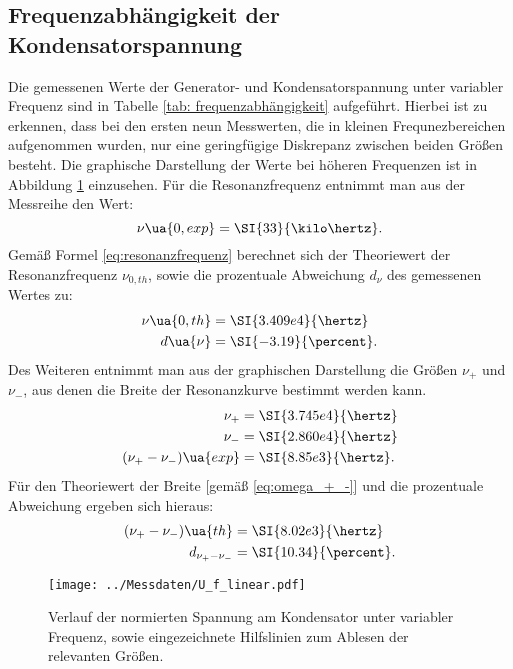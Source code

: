 \subsection{Frequenzabhängigkeit der Kondensatorspannung}
Die gemessenen Werte der Generator- und Kondensatorspannung unter variabler Frequenz sind in Tabelle \ref{tab: frequenzabhängigkeit} aufgeführt.
Hierbei ist zu erkennen, dass bei den ersten neun Messwerten, die in kleinen Frequnezbereichen aufgenommen wurden, nur eine geringfügige
Diskrepanz zwischen beiden Größen besteht. Die graphische Darstellung der Werte bei höheren Frequenzen ist in Abbildung \ref{fig: spannungsverlauf_U_C}
einzusehen. Für die Resonanzfrequenz entnimmt man aus der Messreihe den Wert:
\begin{equation}
  \nu\ua{0, exp} = \SI{33}{\kilo\hertz}.
  \label{eq: exp_resonanzfrequenz}
\end{equation}
Gemäß Formel \eqref{eq:resonanzfrequenz} berechnet sich der Theoriewert der Resonanzfrequenz $\nu_{0, th}$, sowie die prozentuale Abweichung $d_{\nu}$ des gemessenen Wertes zu:
\begin{align}
  \begin{aligned}
  \nu\ua{0, th} &= \SI{3.409e4}{\hertz} \\
  d\ua{\nu} &= \SI{-3.19}{\percent}.
\end{aligned}
\label{eq: theo_resonanzfrequenz}
\end{align}
Des Weiteren entnimmt man aus der graphischen Darstellung die Größen $\nu_+$ und $\nu_-$, aus denen die Breite der Resonanzkurve bestimmt werden kann.
\begin{align}
  \begin{aligned}
  \nu_{+} &= \SI{3.745e4}{\hertz} \\
  \nu_{-} &= \SI{2.860e4}{\hertz} \\
  (\nu_{+}-\nu_{-})\ua{exp} &= \SI{8.85e3}{\hertz}.
\end{aligned}
\label{eq: breite_exp}
\end{align}
Für den Theoriewert der Breite [gemäß \eqref{eq:omega_+_-}] und die prozentuale Abweichung ergeben sich hieraus:
\begin{align}
  \begin{aligned}
  (\nu_{+}-\nu_{-})\ua{th} &= \SI{8.02e3}{\hertz}\\
  d_{\nu_{+}-\nu_{-}} &= \SI{10.34}{\percent}.
\end{aligned}
\label{eq: theo_breite}
\end{align}
\begin{figure}
  \centering
  \texttt{[image: ../Messdaten/U\_f\_linear.pdf]}
  \caption{Verlauf der normierten Spannung am Kondensator unter variabler Frequenz, sowie eingezeichnete Hilfslinien zum Ablesen der relevanten Größen.}
  \label{fig: spannungsverlauf_U_C}
\end{figure}
